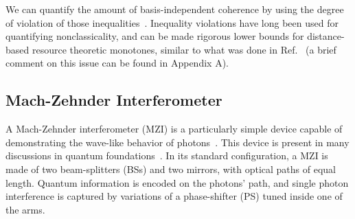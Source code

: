 \documentclass[letterpaper,onecolumn,12pt,accepted=2024-01-17]{article}
\begin{document}
We can quantify the amount of basis-independent coherence by using the degree of violation of those inequalities~\cite{giordani2020experimental}. Inequality violations have long been used for quantifying nonclassicality, and can be made rigorous lower bounds for distance-based resource theoretic monotones, similar to what was done in Ref.~\cite{brito2018quantifying} (a brief comment on this issue can be found in Appendix A).


\subsection{Mach-Zehnder Interferometer}\label{subsec: MZI}


A Mach-Zehnder interferometer (MZI) is a particularly simple device capable of demonstrating the wave-like behavior of photons~\cite{loudon2000quantum,zetie2000does}. This device is present in many discussions in quantum foundations~\cite{hardy1992existence,elitzur1993quantum,catani2021interference}. In its standard configuration, a MZI is made of two beam-splitters (BSs) and two mirrors, with optical paths of equal length. Quantum information is encoded on the photons' path, and single photon interference is captured by variations of a phase-shifter (PS) tuned inside one of the arms. 
\end{document}
